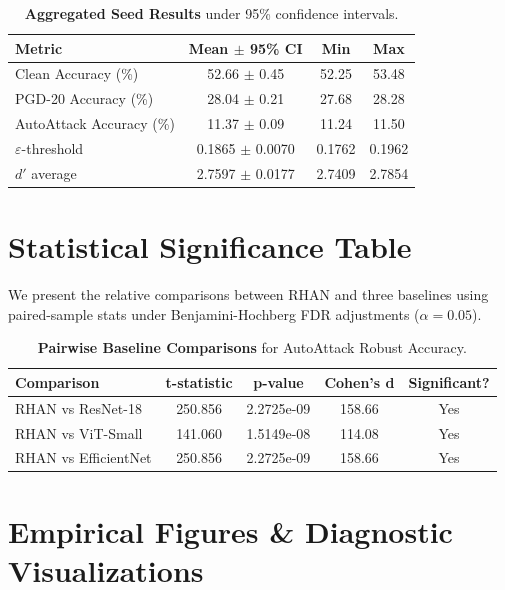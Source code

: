 \documentclass[11pt,a4paper]{article}
\begin{document}
\begin{table}[H]
\centering
\caption{\textbf{Aggregated Seed Results} under 95\% confidence intervals.}
\label{tab:aggregated_seeds}
\begin{tabular}{l c c c}
\toprule
\textbf{Metric} & \textbf{Mean $\pm$ 95\% CI} & \textbf{Min} & \textbf{Max} \\
\midrule
Clean Accuracy (\%) & 52.66 $\pm$ 0.45 & 52.25 & 53.48 \\
PGD-20 Accuracy (\%) & 28.04 $\pm$ 0.21 & 27.68 & 28.28 \\
AutoAttack Accuracy (\%) & 11.37 $\pm$ 0.09 & 11.24 & 11.50 \\
$\varepsilon$-threshold & 0.1865 $\pm$ 0.0070 & 0.1762 & 0.1962 \\
$d'$ average & 2.7597 $\pm$ 0.0177 & 2.7409 & 2.7854 \\
\bottomrule
\end{tabular}
\end{table}

\section{Statistical Significance Table}
We present the relative comparisons between RHAN and three baselines using paired-sample stats under Benjamini-Hochberg FDR adjustments ($\alpha=0.05$).

\begin{table}[H]
\centering
\caption{\textbf{Pairwise Baseline Comparisons} for AutoAttack Robust Accuracy.}
\label{tab:stats_table}
\begin{tabular}{l c c c c}
\toprule
\textbf{Comparison} & \textbf{t-statistic} & \textbf{p-value} & \textbf{Cohen's d} & \textbf{Significant?} \\
\midrule
RHAN vs ResNet-18 & 250.856 & 2.2725e-09 & 158.66 & Yes \\
RHAN vs ViT-Small & 141.060 & 1.5149e-08 & 114.08 & Yes \\
RHAN vs EfficientNet & 250.856 & 2.2725e-09 & 158.66 & Yes \\
\bottomrule
\end{tabular}
\end{table}

\clearpage

\section{Empirical Figures \& Diagnostic Visualizations}
\end{document}
